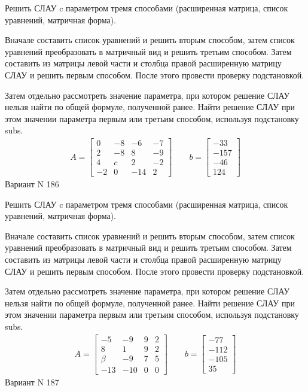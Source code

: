 \documentclass[11pt]{report}
\begin{document}
Решить СЛАУ c параметром тремя способами (расширенная матрица, список уравнений, матричная форма).

Вначале составить список уравнений и решить вторым способом,
затем список уравнений преобразовать в матричный вид и решить третьим способом.
Затем составить из матрицы левой части и столбца правой расширенную матрицу СЛАУ и решить первым способом.
После этого провести проверку подстановкой.

Затем отдельно рассмотреть значение параметра, при котором решение СЛАУ нельзя найти по общей формуле,
полученной ранее.
Найти решение СЛАУ при этом значении параметра первым или третьим способом, используя подстановку subs.
\begin{align*}
    A = \left[\begin{matrix}0 & -8 & -6 & -7\\2 & -8 & 8 & -9\\4 & c & 2 & -2\\-2 & 0 & -14 & 2\end{matrix}\right]
\qquad b = \left[\begin{matrix}-33\\-157\\-46\\124\end{matrix}\right]
\end{align*}
\newpage
Вариант N 186


Решить СЛАУ c параметром тремя способами (расширенная матрица, список уравнений, матричная форма).

Вначале составить список уравнений и решить вторым способом,
затем список уравнений преобразовать в матричный вид и решить третьим способом.
Затем составить из матрицы левой части и столбца правой расширенную матрицу СЛАУ и решить первым способом.
После этого провести проверку подстановкой.

Затем отдельно рассмотреть значение параметра, при котором решение СЛАУ нельзя найти по общей формуле,
полученной ранее.
Найти решение СЛАУ при этом значении параметра первым или третьим способом, используя подстановку subs.
\begin{align*}
    A = \left[\begin{matrix}-5 & -9 & 9 & 2\\8 & 1 & 9 & 2\\\beta & -9 & 7 & 5\\-13 & -10 & 0 & 0\end{matrix}\right]
\qquad b = \left[\begin{matrix}-77\\-112\\-105\\35\end{matrix}\right]
\end{align*}
\newpage
Вариант N 187
\end{document}
